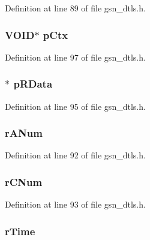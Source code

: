 Definition at line 89 of file gsn\_\-dtls.h.

\hypertarget{a00057_a5ef049defd7cc5565bb3c81588802ef7}{
\subsubsection[{pCtx}]{\setlength{\rightskip}{0pt plus 5cm}VOID$\ast$ {\bf pCtx}}}
\label{a00057_a5ef049defd7cc5565bb3c81588802ef7}


Definition at line 97 of file gsn\_\-dtls.h.

\hypertarget{a00057_a4eb76fd4760396cfaabc5add2dade131}{
\subsubsection[{pRData}]{$\ast$ {\bf pRData}}}
\label{a00057_a4eb76fd4760396cfaabc5add2dade131}


Definition at line 95 of file gsn\_\-dtls.h.

\hypertarget{a00057_ace74cf4b0ebbc99afe9207fcb1c237fd}{
\subsubsection[{rANum}]{ {\bf rANum}}}
\label{a00057_ace74cf4b0ebbc99afe9207fcb1c237fd}


Definition at line 92 of file gsn\_\-dtls.h.

\hypertarget{a00057_a87b9de102825c773d263144bff4217b8}{
\subsubsection[{rCNum}]{ {\bf rCNum}}}
\label{a00057_a87b9de102825c773d263144bff4217b8}


Definition at line 93 of file gsn\_\-dtls.h.

\hypertarget{a00057_aaf93463b79d7a5e2afa4a3849a564ba2}{
\subsubsection[{rTime}]{ {\bf rTime}}}
\label{a00057_aaf93463b79d7a5e2afa4a3849a564ba2}


